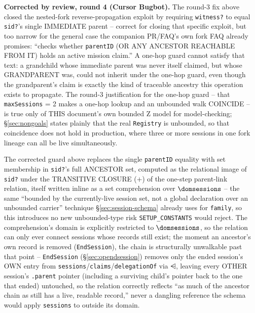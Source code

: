 \documentclass[a4paper,10pt,fleqn]{article}
\newcommand{\field}[1]{\texttt{#1}}
\begin{document}
\textbf{Corrected by review, round 4 (Cursor Bugbot).} The round-3 fix
above closed the nested-fork reverse-propagation exploit by requiring
\field{witness?} to equal \field{sid?}'s single IMMEDIATE parent --
correct for closing that specific exploit, but too narrow for the
general case the companion PR/FAQ's own fork FAQ already promises:
``checks whether \field{parentID} (OR ANY ANCESTOR REACHABLE FROM IT)
holds an active mission claim.'' A one-hop guard cannot satisfy that
text: a grandchild whose immediate parent was never itself claimed, but
whose GRANDPARENT was, could not inherit under the one-hop guard, even
though the grandparent's claim is exactly the kind of traceable
ancestry this operation exists to propagate. The round-3 justification
for the one-hop guard -- that \field{maxSessions} = 2 makes a one-hop
lookup and an unbounded walk COINCIDE -- is true only of THIS
document's own bounded Z model for model-checking; \S\ref{sec:nongoals}
states plainly that the real \field{Registry} is unbounded, so that
coincidence does not hold in production, where three or more sessions
in one fork lineage can all be live simultaneously.

The corrected guard above replaces the single \field{parentID} equality
with set membership in \field{sid?}'s full ANCESTOR set, computed as
the relational image of \field{sid?} under the TRANSITIVE CLOSURE
($\plus$) of the one-step parent-link relation, itself written inline
as a set comprehension over $\dom \field{sessions}$ -- the same
``bounded by the currently-live session set, not a global declaration
over an unbounded carrier'' technique \S\ref{sec:session-schema} already
uses for \field{family}, so this introduces no new unbounded-type risk
\texttt{SETUP\_CONSTANTS} would reject. The comprehension's domain is
explicitly restricted to $\dom \field{sessions}$, so the relation can
only ever connect sessions whose records still exist; the moment an
ancestor's own record is removed (\field{EndSession}), the chain is
structurally unwalkable past that point -- \field{EndSession}
(\S\ref{sec:opendsession}) removes only the ended session's OWN entry
from \field{sessions}/\field{claims}/\field{delegationOf} via
$\ndres$, leaving every OTHER session's \field{.parent} pointer
(including a surviving child's pointer back to the one that ended)
untouched, so the relation correctly reflects ``as much of the
ancestor chain as still has a live, readable record,'' never a
dangling reference the schema would apply \field{sessions} to outside
its domain.
\end{document}
